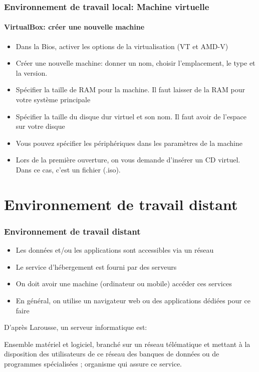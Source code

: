 \documentclass[xcolor=table]{beamer}
\begin{document}
\begin{frame}
\frametitle{Environnement de travail local: Machine virtuelle}
\framesubtitle{VirtualBox: créer une nouvelle machine}

\begin{itemize}
	\item Dans la Bios, activer les options de la virtualisation (VT et AMD-V)
	\item Créer une nouvelle machine: donner un nom, choisir l'emplacement, le type et la version. 
	\item Spécifier la taille de RAM pour la machine. Il faut laisser de la RAM pour votre système principale 
	\item Spécifier la taille du disque dur virtuel et son nom. Il faut avoir de l'espace sur votre disque
	\item Vous pouvez spécifier les périphériques dans les paramètres de la machine 
	\item Lors de la première ouverture, on vous demande d'insérer un CD virtuel. Dans ce cas, c'est un fichier (.iso). 
\end{itemize}

\end{frame}


\section{Environnement de travail distant}

\begin{frame}
\frametitle{Environnement de travail distant}

\begin{itemize}
	\item Les données et/ou les applications sont accessibles via un réseau
	\item Le service d'hébergement est fourni par des serveurs
	\item On doit avoir une machine (ordinateur ou mobile) accéder ces services
	\item En général, on utilise un navigateur web ou des applications dédiées pour ce faire
\end{itemize}

D'après Larousse, un serveur informatique est:
\begin{definition}
	Ensemble matériel et logiciel, branché sur un réseau télématique et mettant à la disposition des utilisateurs de ce réseau des banques de données ou de programmes spécialisées ; organisme qui assure ce service.
\end{definition}

\end{frame}
\end{document}
